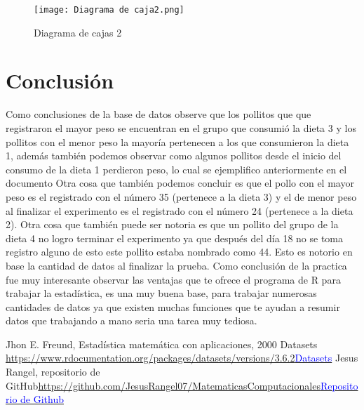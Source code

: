 \documentclass{article}
\begin{document}
\newpage
\begin{figure}[h]
    \centering
    \texttt{[image: Diagrama de caja2.png]}
    \caption{Diagrama de cajas 2 }
    \label{fig:mesh15}
\end{figure}

\section{Conclusión}
Como conclusiones de la base de datos observe que los pollitos que  que registraron el mayor peso se encuentran en el grupo que consumió la dieta 3 y los pollitos con el menor peso la mayoría pertenecen a los que consumieron la dieta 1, además también podemos observar como algunos pollitos desde el inicio del consumo de la dieta 1 perdieron peso, lo cual se ejemplifico anteriormente en el documento
Otra cosa que también podemos concluir es que el pollo con el mayor peso es el registrado con el número 35 (pertenece a la dieta 3) y el de menor peso al finalizar el experimento es el registrado con el número 24 (pertenece a la dieta 2).
Otra cosa que también puede ser notoria es que un pollito del grupo de la dieta 4 no logro terminar el experimento ya que después del día 18 no se toma registro alguno de esto este pollito estaba nombrado como 44. Esto es notorio en base la cantidad de datos al finalizar la prueba.
Como conclusión de la practica fue muy interesante observar las ventajas que te ofrece el programa de R para trabajar la estadística, es una muy buena base, para trabajar numerosas cantidades de datos ya que existen muchas funciones que te ayudan a resumir datos que trabajando a mano seria una tarea muy tediosa.

\newpage
\begin{thebibliography}{0}
   Jhon E. Freund, Estadística matemática con aplicaciones, 2000
   Datasets \textcolor{blue}{\url{https://www.rdocumentation.org/packages/datasets/versions/3.6.2}}\href{https://www.rdocumentation.org/packages/datasets/versions/3.6.2}{\textcolor{blue}{Datasets}}
  Jesus Rangel, repositorio de GitHub\textcolor{blue}{\url{https://github.com/JesusRangel07/MatematicasComputacionales}}\href{https://github.com/JesusRangel07/MatematicasComputacionales}{\textcolor{blue}{Repositorio de Github}}
\end{thebibliography}
\end{document}
